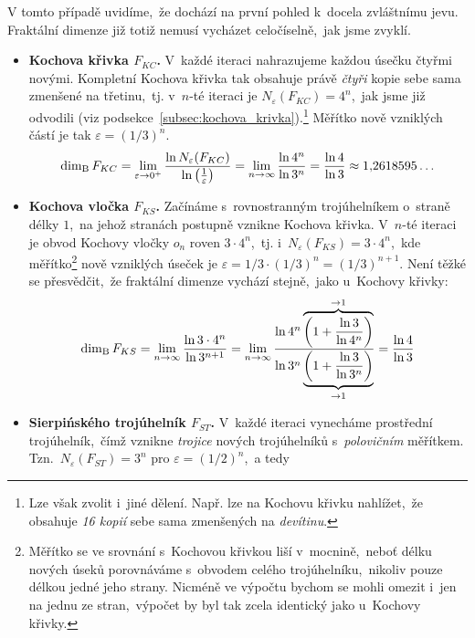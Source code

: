 V tomto případě uvidíme,~že dochází na první pohled k~docela zvláštnímu jevu. Fraktální dimenze již totiž nemusí vycházet celočíselně,~jak jsme zvyklí.
\begin{itemize}
    \item \textbf{Kochova křivka $F_{KC}$.} V~každé iteraci nahrazujeme každou úsečku čtyřmi novými. Kompletní Kochova křivka tak obsahuje právě \emph{čtyři} kopie sebe sama zmenšené na třetinu,~tj. v~$n$-té iteraci je $N_\varepsilon(F_{KC})=4^n$,~jak jsme již odvodili (viz podsekce~\ref{subsec:kochova_krivka}).\footnote{Lze však zvolit i~jiné dělení. Např. lze na Kochovu křivku nahlížet,~že obsahuje \emph{16 kopií} sebe sama zmenšených na \emph{devítinu}.} Měřítko nově vzniklých částí je tak $\varepsilon=(1/3)^n$.
    \begin{equation}\label{eq:kochova-krivka-dimenze}
        \operatorname{dim_B}{F_{KC}}=\lim_{\varepsilon\to 0^+}{\dfrac{\ln{N_\varepsilon(F_{KC})}}{\ln{\left(\frac{1}{\varepsilon}\right)}}}=\lim_{n\to\infty}{\dfrac{\ln{4^n}}{\ln{3^n}}}=\dfrac{\ln{4}}{\ln{3}}\approx 1{,}2618595\dots
    \end{equation}
    \item \textbf{Kochova vločka $F_{KS}$.} Začínáme s~rovnostranným trojúhelníkem o~straně délky $1$,~na jehož stranách postupně vznikne Kochova křivka. V~$n$-té iteraci je obvod Kochovy vločky $o_n$ roven $3\cdot 4^n$,~tj. i~$N_\varepsilon(F_{KS})=3\cdot 4^n$,~kde měřítko\footnote{Měřítko se ve srovnání s~Kochovou křivkou liší v~mocnině,~neboť délku nových úseků porovnáváme s~obvodem celého trojúhelníku,~nikoliv pouze délkou jedné jeho strany. Nicméně ve výpočtu bychom se mohli omezit i~jen na jednu ze stran,~výpočet by byl tak zcela identický jako u~Kochovy křivky.} nově vzniklých úseček je $\varepsilon=1/3\cdot(1/3)^n=(1/3)^{n+1}$. Není těžké se přesvědčit,~že fraktální dimenze vychází stejně,~jako u~Kochovy křivky:
    \begin{equation}\label{eq:kochova-vlocka-dimenze}
        \operatorname{dim_B}{F_{KS}}=\lim_{n\to\infty}{\dfrac{\ln{3\cdot 4^n}}{\ln{3^{n+1}}}}=\lim_{n\to\infty}{\dfrac{\ln{4^n}\overbrace{\left(1+\frac{\ln{3}}{\ln{4^n}}\right)}^{\to 1}}{\ln{3^n}\underbrace{\left(1+\frac{\ln{3}}{\ln{3^n}}\right)}_{\to 1}}}=\dfrac{\ln{4}}{\ln{3}}
    \end{equation}
    \item \textbf{Sierpińského trojúhelník $F_{ST}$.} V~každé iteraci vynecháme prostřední trojúhelník,~čímž vznikne \emph{trojice} nových trojúhelníků s~\emph{polovičním} měřítkem. Tzn.~$N_\varepsilon(F_{ST})=3^n$ pro $\varepsilon=(1/2)^n$,~a tedy

\end{itemize}
